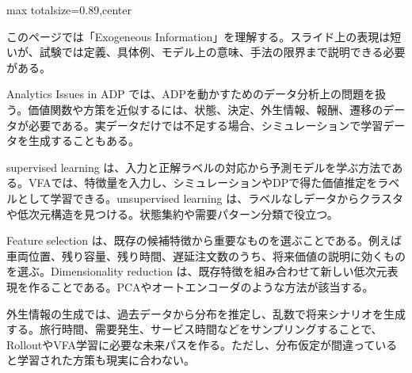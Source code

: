 \begin{minipage}[t]{0.58\textwidth}
\begin{adjustbox}{max totalsize={\textwidth}{0.89\textheight},center}
\begin{minipage}{\textwidth}\scriptsize
{}このページでは「Exogeneous Information」を理解する。スライド上の表現は短いが、試験では定義、具体例、モデル上の意味、手法の限界まで説明できる必要がある。\par
Analytics Issues in ADP では、ADPを動かすためのデータ分析上の問題を扱う。価値関数や方策を近似するには、状態、決定、外生情報、報酬、遷移のデータが必要である。実データだけでは不足する場合、シミュレーションで学習データを生成することもある。\par
supervised learning は、入力と正解ラベルの対応から予測モデルを学ぶ方法である。VFAでは、特徴量を入力し、シミュレーションやDPで得た価値推定をラベルとして学習できる。unsupervised learning は、ラベルなしデータからクラスタや低次元構造を見つける。状態集約や需要パターン分類で役立つ。\par
Feature selection は、既存の候補特徴から重要なものを選ぶことである。例えば車両位置、残り容量、残り時間、遅延注文数のうち、将来価値の説明に効くものを選ぶ。Dimensionality reduction は、既存特徴を組み合わせて新しい低次元表現を作ることである。PCAやオートエンコーダのような方法が該当する。\par
外生情報の生成では、過去データから分布を推定し、乱数で将来シナリオを生成する。旅行時間、需要発生、サービス時間などをサンプリングすることで、RolloutやVFA学習に必要な未来パスを作る。ただし、分布仮定が間違っていると学習された方策も現実に合わない。\par

\end{minipage}
\end{adjustbox}
\end{minipage}
